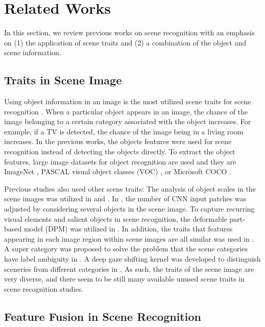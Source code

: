 \documentclass[journal,comsoc]{IEEEtran}
\begin{document}
\section{Related Works}
\label{s2}

In this section, we review previous works on scene recognition with an emphasis on (1) the application of scene traits and (2) a combination of the object and scene information.

\subsection{Traits in Scene Image}
\label{s21}

Using object information in an image is the most utilized scene traits for scene recognition \cite{b7,b9,b21}. When a particular object appears in an image, the chance of the image belonging to a certain category associated with the object increases. For example, if a TV is detected, the chance of the image being in a living room increases. In the previous works, the objects features were used for scene recognition instead of detecting the objects directly. To extract the object features, large image datasets for object recognition are used and they are ImageNet \cite{b19}, PASCAL visual object classes (VOC) \cite{b42}, or Microsoft COCO \cite{b43}.

Previous studies also used other scene traits: The analysis of object scales in the scene images was utilized in \cite{b7} and \cite{b6}. In \cite{b9,b13,b14,b15}, the number of CNN input patches was adjusted by considering several objects in the scene image. To capture recurring visual elements and salient objects in scene recognition, the deformable part-based model (DPM) was utilized in \cite{b2}. In addition, the traits that features appearing in each image region within scene images are all similar was used in \cite{b1}. A super category was proposed to solve the problem that the scene categories have label ambiguity in \cite{b5}. A deep gaze shifting kernel was developed to distinguish sceneries from different categories in \cite{b12}. As such, the traits of the scene image are very diverse, and there seem to be still many available unused scene traits in scene recognition studies.


\subsection{Feature Fusion in Scene Recognition}
\label{s22}
\end{document}
